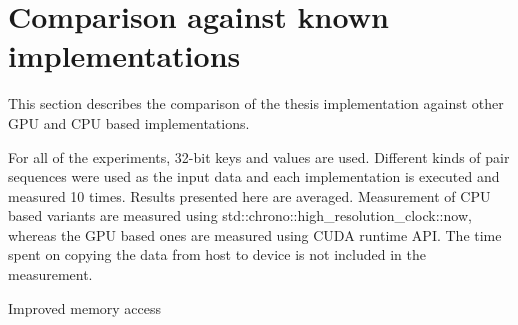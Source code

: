 \section{Comparison against known implementations}

This section describes the comparison of the thesis implementation against other GPU and CPU based implementations. 

For all of the experiments, 32-bit keys and values are used. Different kinds of pair sequences were used as the input data and each implementation is executed and measured 10 times. Results presented here are averaged. Measurement of CPU based variants are measured using {std::chrono::high\_resolution\_clock::now}, whereas the GPU based ones are measured using CUDA runtime API. The time spent on copying the data from host to device is not included in the measurement.



 Improved memory access